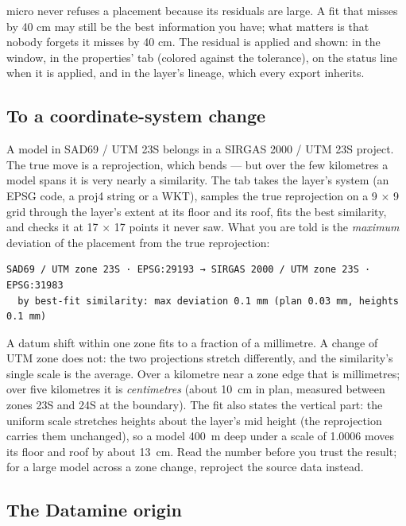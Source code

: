 \begin{why}
micro never refuses a placement because its residuals are large. A fit that misses by 40 cm may still be
the best information you have; what matters is that nobody forgets it misses by 40 cm. The residual is
applied and shown: in the window, in the properties'  tab (colored against the tolerance), on
the status line when it is applied, and in the layer's lineage, which every export inherits.
\end{why}

\subsection{To a coordinate-system change}\label{sec:crs-placement-crs}

A model in SAD69 / UTM 23S belongs in a SIRGAS 2000 / UTM 23S project. The true move is a reprojection,
which bends — but over the few kilometres a model spans it is very nearly a similarity. The  tab takes the layer's system (an EPSG code, a proj4 string or a WKT), samples the true
reprojection on a 9 × 9 grid through the layer's extent at its floor and its roof, fits the best
similarity, and checks it at 17 × 17 points it never saw. What you are told is the \emph{maximum}
deviation of the placement from the true reprojection:

\begin{lstlisting}
SAD69 / UTM zone 23S · EPSG:29193 → SIRGAS 2000 / UTM zone 23S · EPSG:31983
  by best-fit similarity: max deviation 0.1 mm (plan 0.03 mm, heights 0.1 mm)
\end{lstlisting}

A datum shift within one zone fits to a fraction of a millimetre. A change of UTM zone does not: the two
projections stretch differently, and the similarity's single scale is the average. Over a kilometre near
a zone edge that is millimetres; over five kilometres it is \emph{centimetres} (about 10~cm in plan,
measured between zones 23S and 24S at the boundary). The fit also states the vertical part: the uniform
scale stretches heights about the layer's mid height (the reprojection carries them unchanged), so a
model 400~m deep under a scale of 1.0006 moves its floor and roof by about 13~cm. Read the number before
you trust the result; for a large model across a zone change, reproject the source data instead.

\subsection{The Datamine origin}

